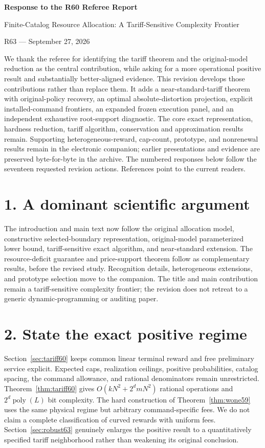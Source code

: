 \documentclass[11pt,letterpaper]{article}
\theoremstyle{definition}\newtheorem{remark}[theorem]{Remark}
\begin{document}
\begin{center}{\Large\bfseries Response to the R60 Referee Report}\par
Finite-Catalog Resource Allocation: A Tariff-Sensitive Complexity Frontier\par
R63 --- September 27, 2026\end{center}
We thank the referee for identifying the tariff theorem and the original-model reduction as the central contribution, while asking for a more operational positive result and substantially better-aligned evidence. This revision develops those contributions rather than replace them. It adds a near-standard-tariff theorem with original-policy recovery, an optimal absolute-distortion projection, explicit installed-command frontiers, an expanded frozen execution panel, and an independent exhaustive root-support diagnostic. The core exact representation, hardness reduction, tariff algorithm, conservation and approximation results remain. Supporting heterogeneous-reward, cap-count, prototype, and nonrenewal results remain in the electronic companion; earlier presentations and evidence are preserved byte-for-byte in the archive. The numbered responses below follow the seventeen requested revision actions. References point to the current readers.

\section*{1. A dominant scientific argument}
The introduction and main text now follow the original allocation model, constructive selected-boundary representation, original-model parameterized lower bound, tariff-sensitive exact algorithm, and near-standard extension. The resource-deficit guarantee and price-support theorem follow as complementary results, before the revised study. Recognition details, heterogeneous extensions, and prototype selection move to the companion. The title and main contribution remain a tariff-sensitive complexity frontier; the revision does not retreat to a generic dynamic-programming or auditing paper.

\section*{2. State the exact positive regime}
Section~\ref{sec:tariff60} keeps common linear terminal reward and free preliminary service explicit. Expected caps, realization ceilings, positive probabilities, catalog spacing, the command allowance, and rational denominators remain unrestricted. Theorem~\ref{thm:tariff60} gives $O(kN^2+2^d mN^2)$ rational operations and $2^d\operatorname{poly}(L)$ bit complexity. The hard construction of Theorem~\ref{thm:wone59} uses the same physical regime but arbitrary command-specific fees. We do not claim a complete classification of curved rewards with uniform fees. Section~\ref{sec:robust63} genuinely enlarges the positive result to a quantitatively specified tariff neighborhood rather than weakening its original conclusion.
\end{document}
